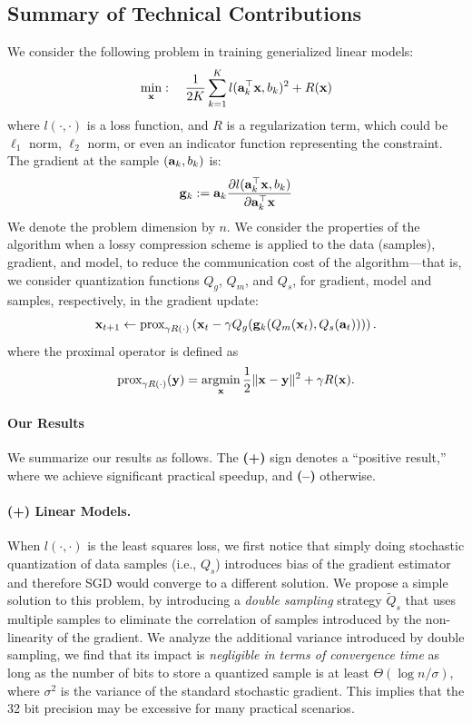 \documentclass{article}
\renewcommand{\vec}[1]{\mathbf{#1}}
\def\a{{\bf a}}
\def\g{{\bf g}}
\def\x{{\bf x}}
\def\y{{\bf y}}
\DeclareMathOperator*{\argmin}{argmin}
\begin{document}
\vspace{-1em}
\subsection{Summary of Technical Contributions}
\vspace{-0.5em}

We consider the following problem in training generialized linear models: 
\begin{align}
\min_{\x}:\quad {1\over 2K}\sum_{k=1}^K l(\a_k^\top \x, b_k)^2 + R(\x)
\label{eqn:leastsquares}
\end{align}
where $l(\cdot,\cdot)$ is a loss function, and $R$ is a regularization term, which could be $\ell_1$ norm, $\ell_2$ norm, or even an indicator function representing the constraint. 
The gradient at the sample $(\a_k, b_k)$ is: 
\[
\g_k := \a_k \frac{\partial l(\a_k^\top \x, b_k)}{\partial \a_k^\top \x} 
\]
We denote the problem dimension by $n$. 
We consider the properties of the algorithm when a lossy compression scheme is applied to the data (samples), 
gradient, and model, to reduce the communication cost of the algorithm---that is, we consider quantization functions $Q_g$, $Q_m$, and $Q_s$, for gradient, model and samples, respectively, in the gradient update:
\begin{align}
\x_{t + 1} \leftarrow \text{prox}_{\gamma R(\cdot)}\left(\x_t - \gamma Q_g(\g_k (Q_m(\x_t), Q_s(\vec{a}_t)))\right).
\label{eq:proxupdate}
\end{align}
where the proximal operator is defined as
\[
\text{prox}_{\gamma R(\cdot)}(\y) =\argmin_{\x} {1\over 2}\|\x-\y\|^2 + \gamma R(\x).
\]

\vspace{-1.5em}
\paragraph{Our Results} We summarize our results as follows. The {\bf (+)}
sign denotes a ``positive result,'' where we achieve
significant practical speedup, and {\bf (--)} otherwise.

\vspace{-1em}
\paragraph{(+) Linear Models.} When $l(\cdot,\cdot)$ is 
the least squares loss, we first notice that
simply doing stochastic quantization of data samples  
(i.e., $Q_s$) introduces bias of the gradient
estimator and therefore SGD would converge
to a different solution. We propose a simple
solution to this problem, by introducing a
{\em double sampling} strategy
$\tilde{Q}_s$ that uses multiple samples to
eliminate the correlation of samples introduced
by the non-linearity of the gradient. We
analyze the additional variance introduced
by double sampling, we find that its impact is \emph{negligible in terms of convergence time} as long as the 
number of bits to store a quantized sample is at least $\Theta( \log n / \sigma )$, 
where $\sigma^2$ is the variance of the standard stochastic gradient. 
This implies that the 32 bit precision may be excessive for many practical scenarios. 
\end{document}
